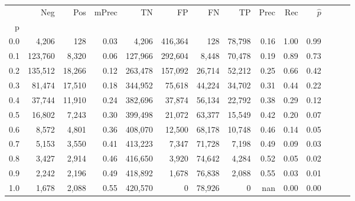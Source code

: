 \begin{tabular}{rrrrrrrrrrrrrr}
\toprule
{} &      Neg &     Pos & mPrec &       TN &       FP &      FN &      TP &  Prec &   Rec & $\hat{p}$ \\
p   &          &         &       &          &          &         &         &       &       &           \\
\midrule
0.0 &    4,206 &     128 &  0.03 &    4,206 &  416,364 &     128 &  78,798 &  0.16 &  1.00 &      0.99 \\
0.1 &  123,760 &   8,320 &  0.06 &  127,966 &  292,604 &   8,448 &  70,478 &  0.19 &  0.89 &      0.73 \\
0.2 &  135,512 &  18,266 &  0.12 &  263,478 &  157,092 &  26,714 &  52,212 &  0.25 &  0.66 &      0.42 \\
0.3 &   81,474 &  17,510 &  0.18 &  344,952 &   75,618 &  44,224 &  34,702 &  0.31 &  0.44 &      0.22 \\
0.4 &   37,744 &  11,910 &  0.24 &  382,696 &   37,874 &  56,134 &  22,792 &  0.38 &  0.29 &      0.12 \\
0.5 &   16,802 &   7,243 &  0.30 &  399,498 &   21,072 &  63,377 &  15,549 &  0.42 &  0.20 &      0.07 \\
0.6 &    8,572 &   4,801 &  0.36 &  408,070 &   12,500 &  68,178 &  10,748 &  0.46 &  0.14 &      0.05 \\
0.7 &    5,153 &   3,550 &  0.41 &  413,223 &    7,347 &  71,728 &   7,198 &  0.49 &  0.09 &      0.03 \\
0.8 &    3,427 &   2,914 &  0.46 &  416,650 &    3,920 &  74,642 &   4,284 &  0.52 &  0.05 &      0.02 \\
0.9 &    2,242 &   2,196 &  0.49 &  418,892 &    1,678 &  76,838 &   2,088 &  0.55 &  0.03 &      0.01 \\
1.0 &    1,678 &   2,088 &  0.55 &  420,570 &        0 &  78,926 &       0 &   nan &  0.00 &      0.00 \\
\bottomrule
\end{tabular}

